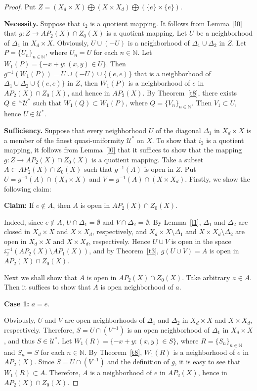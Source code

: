 \documentclass{amsart}
\theoremstyle{definition}
\begin{document}
\begin{proof}
Put $Z=(X_{d}\times X)\bigoplus (X\times X_{d})\bigoplus (\{e\}\times\{e\})$.

{\bf Necessity.} Suppose that $i_{2}$ is a quotient mapping.  It follows from Lemma~\ref{l0} that $g: Z\longrightarrow AP_{2}(X)\cap Z_{0}(X)$ is a quotient mapping. Let $U$ be a neighborhood of $\Delta_{1}$ in $X_{d}\times X$. Obviously, $U\cup (-U)$ is a neighborhood of $\Delta_{1}\cup\Delta_{2}$ in $Z$. Let $P=\{U_n\}_{n\in\mathbb{N}}$, where $U_{n}=U$ for each $n\in \mathbb{N}$. Let  $W_{1}(P)=\{-x+y: (x, y)\in U\}$. Then $g^{-1}(W_{1}(P))=U\cup (-U)\cup \{(e, e)\}$ that is a neighborhood of $\Delta_{1}\cup\Delta_{2}\cup \{(e, e)\}$ in $Z$, then $W_{1}(P)$ is a neighborhood of $e$ in $AP_{2}(X)\cap Z_{0}(X)$, and hence in $AP_{2}(X)$. By Theorem~\ref{t8}, there exists $Q\in\ ^{\omega}\mathscr{U}^{\ast}$  such that $W_{1}(Q)\subset W_{1}(P)$, where $Q=\{V_n\}_{n\in\mathbb{N}}$. Then $V_1\subset U$, hence $U\in\mathscr{U}^{\ast}$.

{\bf Sufficiency.} Suppose that every neighborhood $U$ of the diagonal $\Delta_{1}$ in $X_{d}\times X$ is a member of the finest quasi-uniformity $\mathscr{U}^{\ast}$ on $X$. To show that $i_{2}$ is a quotient mapping, it follows from Lemma~\ref{l0} that it suffices to show that the mapping $g: Z\longrightarrow AP_{2}(X)\cap Z_{0}(X)$ is a quotient mapping. Take a subset $A\subset AP_{2}(X)\cap Z_{0}(X)$ such that $g^{-1}(A)$ is open in $Z$. Put $U=g^{-1}(A)\cap (X_{d}\times X)$ and $V=g^{-1}(A)\cap (X\times X_{d})$. Firstly, we show the following claim:

{\bf Claim:} If $e\not\in A$, then $A$ is open in $AP_{2}(X)\cap Z_{0}(X)$.

Indeed, since $e\not\in A$, $U\cap \Delta_{1}=\emptyset$ and $V\cap \Delta_{2}=\emptyset$. By Lemma~\ref{l1}, $\Delta_{1}$ and $\Delta_{2}$ are closed in $X_{d}\times X$ and $X\times X_{d}$, respectively, and $X_{d}\times X\setminus\Delta_{1}$ and $X\times X_{d}\setminus\Delta_{2}$ are open in $X_{d}\times X$ and $X\times X_{d}$, respectively. Hence $U\cup V$ is open in the space
$i_{2}^{-1}(AP_{2}(X)\setminus AP_{1}(X))$, and by Theorem~\ref{t3}, $g(U\cup V)=A$ is open in $AP_{2}(X)\cap Z_{0}(X)$.

Next we shall show that $A$ is open in $AP_{2}(X)\cap Z_{0}(X)$. Take arbitrary $a\in A$. Then it suffices to show that $A$ is open neighborhood of $a$.

{\bf Case 1:} $a=e$.

Obviously, $U$ and $V$ are open neighborhoods of $\Delta_{1}$ and $\Delta_{2}$ in $X_{d}\times X$ and $X\times X_{d}$, respectively. Therefore, $S=U\cap (V^{-1})$ is an open neighborhood of $\Delta_{1}$ in $X_{d}\times X$, and thus $S\in \mathscr{U}^{\ast}$. Let $W_{1}(R)=\{-x+y: (x, y)\in S\}$, where $R=\{S_{n}\}_{n\in\mathbb{N}}$ and $S_{n}=S$ for each $n\in\mathbb{N}$. By Theorem~\ref{t8}, $W_{1}(R)$ is a neighborhood of $e$ in $AP_{2}(X)$. Since $S=U\cap (V^{-1})$ and the definition of $g$, it is easy to see that $W_{1}(R)\subset A$. Therefore, $A$ is a neighborhood of $e$ in $AP_{2}(X)$, hence in $AP_{2}(X)\cap Z_{0}(X).$


\end{proof}
\end{document}
